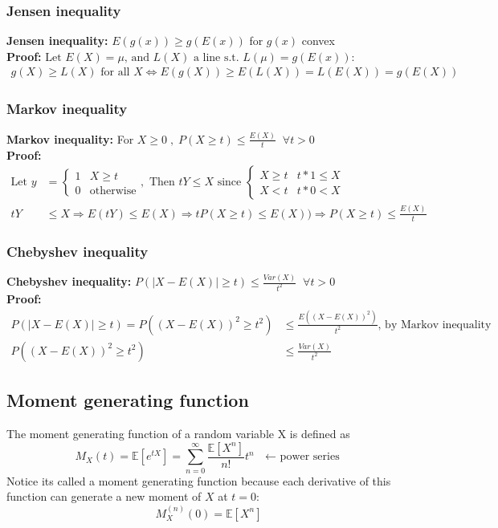 \documentclass{article}
\newcommand{\abs}[1]{\lvert#1\rvert}
\begin{document}
\subsubsection{Jensen inequality}
\textbf{Jensen inequality: } $E(g(x)) \geq g(E(x))$ for $g(x)$ convex\\
\textbf{Proof: } $\textrm{Let } E(X) = \mu \textrm{, and } L(X) \textrm{ a line s.t. } L(\mu) = g(E(x)):$
\begin{align*}
    g(X) \geq L(X) \textrm{ for all } X \Longleftrightarrow E(g(X)) \geq E(L(X)) = L(E(X)) = g(E(X))
\end{align*}

\subsubsection{Markov inequality}
\textbf{Markov inequality: } For $X\geq 0 \;, \;P(X \geq t) \leq \frac{E(X)}{t} \; \; \forall t>0$\\
\textbf{Proof: }
\begin{align*}
    \textrm{Let } y &= \begin{cases}
        1 & X \geq t\\
        0 & \textrm{otherwise}
    \end{cases}, \textrm{  Then } tY \leq X \textrm{ since } \begin{cases}
        X \geq t & t*1 \leq X \\
        X < t & t*0 < X
    \end{cases}\\
    tY &\leq X \Longrightarrow E(tY) \leq E(X) \Longrightarrow tP(X \geq t) \leq E(X)) \Longrightarrow P(X \geq t) \leq \frac{E(X)}{t}
\end{align*}

\subsubsection{Chebyshev inequality}
\textbf{Chebyshev inequality: } $P(\abs{X - E(X)} \geq t) \leq \frac{Var(X)}{t^2} \; \; \forall t > 0$\\
\textbf{Proof: }
\begin{align*}
    P(\abs{X - E(X)} \geq t) = P((X - E(X))^2 \geq t^2) &\leq \frac{E((X - E(X))^2)}{t^2} \textrm{, by Markov inequality}\\
    P((X - E(X))^2 \geq t^2) &\leq \frac{Var(X)}{t^2}
\end{align*}

\subsection{Moment generating function}
The moment generating function of a random variable X is defined as 
\begin{equation*}
	M_X(t) = \mathbb{E}[e^{tX}] = \sum_{n=0}^\infty\frac{\mathbb{E}[X^n]}{n!}t^n \textrm{ $\leftarrow$ power series}
\end{equation*}
Notice its called a moment generating function because each derivative of this function can generate a new moment of $X$ at $t=0$:
\begin{equation*}
	M_X^{(n)}(0) = \mathbb{E}[X^n]
\end{equation*}
\end{document}
